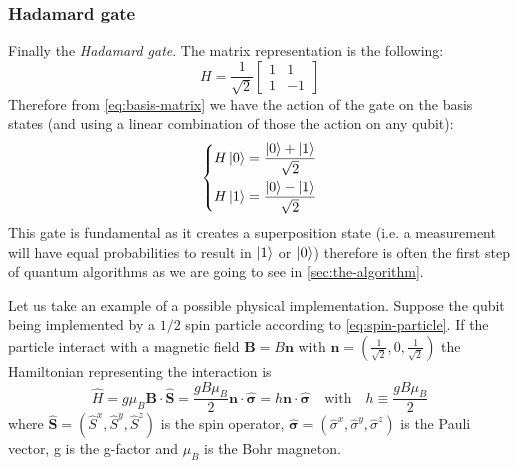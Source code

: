 \subsubsection{Hadamard gate}
Finally the \emph{Hadamard gate}. The matrix representation is the following:
\begin{equation}\label{eq:hadamard-gate}
    H = \frac{1}{\sqrt{2}}
    \begin{bmatrix}
    1 & 1\\
    1 & -1
    \end{bmatrix}
\end{equation}
Therefore from \eqref{eq:basis-matrix} we have the action of the gate on the basis states (and using a linear combination of those the action on any qubit):
\begin{equation}
\left\{
\begin{aligned}
    H\ket{0} &= \frac{\ket{0} + \ket{1}}{\sqrt{2}} \\
    H\ket{1} &= \frac{\ket{0} - \ket{1}}{\sqrt{2}}
\end{aligned}
\right.
\end{equation}
This gate is fundamental as it creates a superposition state (i.e. a measurement will have equal probabilities to result in $\ket{1}$ or $\ket{0}$) therefore is often the first step of quantum algorithms as we are going to see in \ref{sec:the-algorithm}.


Let us take an example of a possible physical implementation. Suppose the qubit being implemented by a $1/2$ spin particle according to \eqref{eq:spin-particle}.  If the particle interact with a magnetic field $\mathbf{B} = B\mathbf{n}$ with $\mathbf{n} = (\frac{1}{\sqrt{2}}, 0, \frac{1}{\sqrt{2}})$ the Hamiltonian representing the interaction is
\begin{equation*}
    \hat{H} = g\mu_B \mathbf{B} \cdot \hat{\mathbf{S}} = \frac{gB\mu_B}{2} \mathbf{n} \cdot \hat{\boldsymbol{\sigma}} = h \mathbf{n} \cdot \hat{\boldsymbol{\sigma}} \quad \text{with} \quad h \equiv \frac{gB\mu_B}{2}
\end{equation*}
where $\hat{\mathbf{S}} = (\hat{S}^x, \hat{S}^y, \hat{S}^z)$ is the spin operator, $\hat{\boldsymbol{\sigma}} = (\hat{\sigma}^x, \hat{\sigma}^y, \hat{\sigma}^z)$ is the Pauli vector, g is the g-factor and $\mu_B$ is the Bohr magneton.


